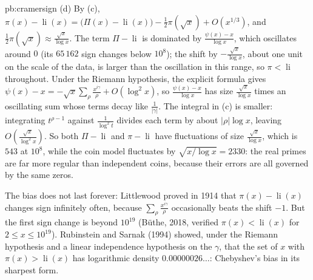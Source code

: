 \begin{solution}{pb:cramersign}
(d) By (c), $\pi(x)-\operatorname{li}(x)=\bigl(\Pi(x)-\operatorname{li}(x)\bigr)-\frac12\pi(\sqrt x)+O(x^{1/3})$, and $\frac12\pi(\sqrt x)\approx\frac{\sqrt x}{\log x}$. The term $\Pi-\operatorname{li}$ is dominated by
$\frac{\psi(x)-x}{\log x}$, which oscillates around $0$ (its $65\,162$ sign changes below $10^8$); the shift by $-\frac{\sqrt x}{\log x}$, about one unit on the scale of the data, is larger
than the oscillation in this range, so $\pi<\operatorname{li}$ throughout. Under the Riemann hypothesis, the explicit formula gives $\psi(x)-x=-\sqrt x\sum_\rho\frac{x^{i\gamma}}\rho+O(\log^2x)$,
so $\frac{\psi(x)-x}{\log x}$ has size $\frac{\sqrt x}{\log x}$ times an oscillating sum whose terms decay like $\frac1{|\gamma|}$. The integral in (c) is smaller: integrating $t^{\rho-1}$ against
$\frac1{\log^2t}$ divides each term by about $|\rho|\log x$, leaving $O(\frac{\sqrt x}{\log^2x})$. So both $\Pi-\operatorname{li}$ and $\pi-\operatorname{li}$ have fluctuations of size $\frac{\sqrt x}{\log x}$,
which is $543$ at $10^8$, while the coin model fluctuates by $\sqrt{x/\log x}=2330$: the real primes are far more regular than independent coins, because their errors are all
governed by the same zeros.


\leads The bias does not last forever: Littlewood proved in 1914 that $\pi(x)-\operatorname{li}(x)$ changes sign infinitely often, because $\sum_\rho\frac{x^{i\gamma}}\rho$ occasionally beats
the shift $-1$. But the first sign change is beyond $10^{19}$ (Büthe, 2018, verified $\pi(x)<\operatorname{li}(x)$ for $2\le x\le10^{19}$). Rubinstein and Sarnak (1994) showed, under the
Riemann hypothesis and a linear independence hypothesis on the $\gamma$, that the set of $x$ with $\pi(x)>\operatorname{li}(x)$ has logarithmic density $0.00000026\ldots$: Chebyshev's bias in
its sharpest form.
\end{solution}

